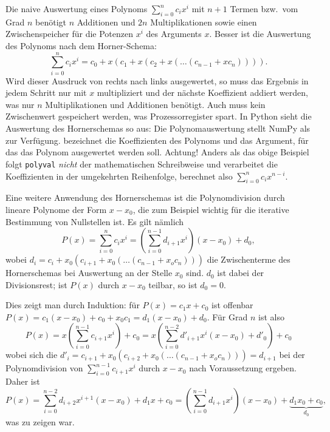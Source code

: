 Die naive Auswertung eines Polynoms $\sum_{i=0}^{n} c_ix^{i}$ mit
$n+1$ Termen bzw.\ vom Grad $n$ benötigt $n$ Additionen und $2n$
Multiplikationen sowie einen Zwischenspeicher für die Potenzen $x^i$
des Arguments $x$. Besser ist die Auswertung des Polynoms nach dem
Horner-Schema:
\begin{equation}
  \label{eq:horner}
  \sum_{i=0}^{n} c_ix^{i} = c_0 + x(c_1 + x(c_2 + x(\ldots (c_{n-1} + x c_{n})))).
\end{equation}
Wird dieser Ausdruck von rechts nach links ausgewertet, so muss das
Ergebnis in jedem Schritt nur mit $x$ multipliziert und der nächste
Koeffizient addiert werden, was nur $n$ Multiplikationen und
Additionen benötigt. Auch muss kein Zwischenwert gespeichert werden,
was Prozessorregister spart. In Python sieht die Auswertung des
Hornerschemas so aus:%
%
\sloppypar Die Polynomauswertung stellt NumPy als
 zur Verfügung.  bezeichnet die
Koeffizienten des Polynoms und  das Argument, für das das
Polynom ausgewertet werden soll. Achtung! Anders als das obige
Beispiel folgt \lstinline!polyval! \emph{nicht} der mathematischen
Schreibweise und verarbeitet die Koeffizienten in der umgekehrten
Reihenfolge, berechnet also $\sum_{i=0}^{n} c_ix^{n-i}$.

Eine weitere Anwendung des Hornerschemas ist die Polynomdivision durch
lineare Polynome der Form $x-x_0$, die zum Beispiel wichtig für die
iterative Bestimmung von Nullstellen ist. Es gilt nämlich
\begin{equation}
  \label{eq:polynomdiv}
  P(x) = \sum_{i=0}^{n} c_ix^{i} = 
  \left(\sum_{i=0}^{n-1} d_{i+1}x^{i}\right)(x-x_0) + d_0,
\end{equation}
wobei $d_i = c_i + x_0(c_{i+1} + x_0(\ldots (c_{n-1} + x_o c_n)))$ die
Zwischenterme des Hornerschemas bei Auswertung an der Stelle $x_0$
sind. $d_0$ ist dabei der Divisionsrest; ist $P(x)$ durch $x-x_0$
teilbar, so ist $d_0=0$. 

Dies zeigt man durch Induktion: für $P(x) = c_1 x + c_0$ ist offenbar
$P(x) = c_1(x-x_0) + c_0 + x_0 c_1 = d_1(x-x_0) + d_0$. Für Grad $n$ ist
also
\begin{equation}
    P(x) = x \left(\sum_{i=0}^{n-1} c_{i+1}x^{i}\right) + c_0
    = x\left(\sum_{i=0}^{n-2} d'_{i+1}x^{i}(x-x_0) + d'_0\right) +
    c_0
\end{equation}
wobei sich die $d'_i = c_{i+1} + x_0(c_{i+2} + x_0(\ldots (c_{n-1} +
x_o c_n))) = d_{i+1}$ bei der Polynomdivision von $\sum_{i=0}^{n-1}
c_{i+1}x^{i}$ durch $x-x_0$ nach Voraussetzung ergeben. Daher ist
\begin{equation}
  P(x) = \sum_{i=0}^{n-2} d_{i+2}x^{i+1}(x-x_0) + d_1 x + c_0
  = \left(\sum_{i=0}^{n-1} d_{i+1}x^{i}\right)(x-x_0) +
  \underbrace{d_1 x_0 + c_0}_{d_0},
\end{equation}
was zu zeigen war.

